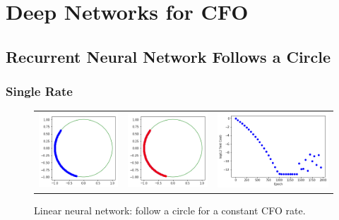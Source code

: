 \chapter{Deep Networks for CFO}

\section{Recurrent Neural Network Follows a Circle}

\subsection{Single Rate}

\setlength{\tabcolsep}{0pt}
\begin{figure}
  \centering
  \caption{Linear neural network: follow a circle for a constant CFO rate.}
  \begin{tabular}{ccc}
    \includegraphics[width=50mm]{figures/follow_circle_linear_before.png}&
    \includegraphics[width=50mm]{figures/follow_circle_linear_after.png}&
    \includegraphics[width=70mm]{figures/follow_circle_linear_loss.png}\\
  \end{tabular}
  \label{fig:circle_constant_rate}
\end{figure}

